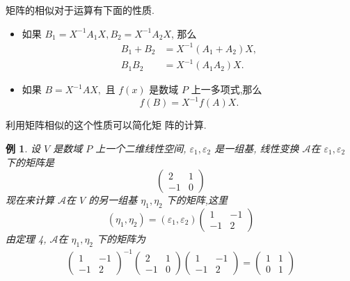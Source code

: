 \documentclass[13pt]{beamer}
\newtheorem{exa}{例}
\def\A{\mathscr{A}}
\begin{document}
\begin{frame}
矩阵的相似对于运算有下面的性质.  

\begin{itemize}
	\item 如果 ${B}_{1}={X}^{-1} {A}_{1} {X}, {B}_{2}={X}^{-1} {A}_{2} {X}$, 那么
\begin{align*}
	{B}_{1}+{B}_{2} & ={X}^{-1}\left({A}_{1}+{A}_{2}\right) {X}, \\
	{B}_{1} {B}_{2} & ={X}^{-1}\left({A}_{1} {A}_{2}\right) {X}.
\end{align*}
	\item 如果 ${B}={X}^{-1} {A} {X},$ 且 $f(x)$ 是数域 $P$ 上一多项式,那么
	\[
	f({B})={X}^{-1} f({A}) {X}.
	\]
	
\end{itemize}

\end{frame}

\begin{frame}
利用矩阵相似的这个性质可以简化矩
阵的计算. 
\begin{exa}
设 $V$ 是数域 $P$ 上一个二维线性空间, ${\varepsilon}_{1}, {\varepsilon}_{2}$ 是一组基,
线性变换 $\A$在 ${\varepsilon}_{1}, {\varepsilon}_{2}$ 下的矩阵是
\[
\left(\begin{array}{rr}
2 & 1 \\
-1 & 0
\end{array}\right)
\]
现在来计算 $\A$在 $V$ 的另一组基 ${\eta}_{1}, {\eta}_{2}$ 下的矩阵,这里
\[
\left({\eta}_{1}, {\eta}_{2}\right)=\left({\varepsilon}_{1}, {\varepsilon}_{2}\right)\left(\begin{array}{rr}
1 & -1 \\
-1 & 2
\end{array}\right)
\]
由定理 4, $\A$在 ${\eta}_{1}, {\eta}_{2}$ 下的矩阵为
\[
\begin{array}{l}
\left(\begin{array}{rr}
1 & -1 \\
-1 & 2
\end{array}\right)^{-1}\left(\begin{array}{rr}
2 & 1 \\
-1 & 0
\end{array}\right)\left(\begin{array}{rr}
1 & -1 \\
-1 & 2
\end{array}\right) =\left(\begin{array}{rr}
1 & 1 \\
0 & 1
\end{array}\right)
\end{array}
\]
\end{exa}
\end{frame}
\end{document}
